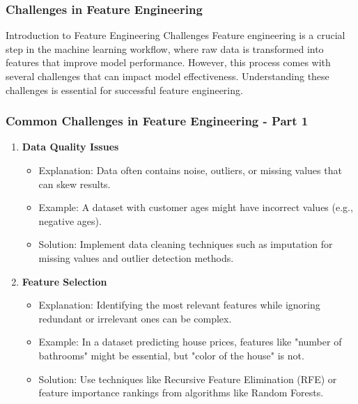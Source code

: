 \documentclass[aspectratio=169]{beamer}
\begin{document}
\begin{frame}
    \frametitle{Challenges in Feature Engineering}
    \begin{block}{Introduction to Feature Engineering Challenges}
        Feature engineering is a crucial step in the machine learning workflow, where raw data is transformed into features that improve model performance. However, this process comes with several challenges that can impact model effectiveness. Understanding these challenges is essential for successful feature engineering.
    \end{block}
\end{frame}

\begin{frame}
    \frametitle{Common Challenges in Feature Engineering - Part 1}
    \begin{enumerate}
        \item \textbf{Data Quality Issues}
            \begin{itemize}
                \item Explanation: Data often contains noise, outliers, or missing values that can skew results.
                \item Example: A dataset with customer ages might have incorrect values (e.g., negative ages).
                \item Solution: Implement data cleaning techniques such as imputation for missing values and outlier detection methods.
            \end{itemize}
        
        \item \textbf{Feature Selection}
            \begin{itemize}
                \item Explanation: Identifying the most relevant features while ignoring redundant or irrelevant ones can be complex.
                \item Example: In a dataset predicting house prices, features like "number of bathrooms" might be essential, but "color of the house" is not.
                \item Solution: Use techniques like Recursive Feature Elimination (RFE) or feature importance rankings from algorithms like Random Forests.
            \end{itemize}
    \end{enumerate}
\end{frame}
\end{document}
